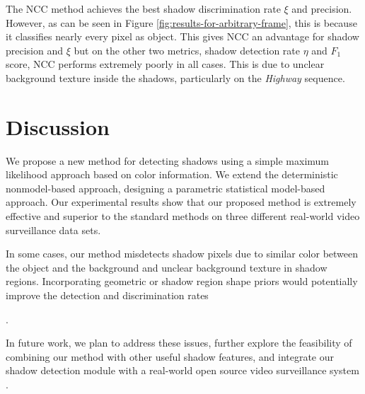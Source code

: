 The NCC method achieves the best shadow discrimination rate $\xi$ and
precision. However, as can be seen in
Figure \ref{fig:results-for-arbitrary-frame}, this is because it
classifies nearly every pixel as object.  This gives NCC an advantage
for shadow precision and $\xi$ but on the other two metrics, shadow
detection rate $\eta$ and $F_1$ score, NCC performs extremely poorly
in all cases.  This is due to unclear background texture inside the
shadows, particularly on the \textit{Highway} sequence.

\section{Discussion}
\label{sec:shadow-discussion}

We propose a new method for detecting shadows using a simple maximum
likelihood approach based on color information.  We extend the
deterministic nonmodel-based approach, designing a parametric
statistical model-based approach. Our experimental results show that
our proposed method is extremely effective and superior to the
standard methods on three different real-world video surveillance data
sets.

In some cases, our method misdetects shadow pixels due to similar
color between the object and the background and unclear background
texture in shadow regions. Incorporating geometric or shadow region
shape priors would potentially improve the detection and
discrimination rates\DIFaddbegin {}

\DIFaddend .

In future work, we plan to address these issues, further explore the
feasibility of combining our method with other useful shadow features,
and integrate our shadow detection module with a real-world open
source video surveillance system .

\FloatBarrier



